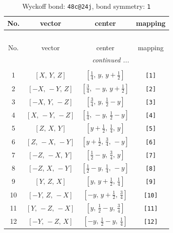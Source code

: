 \documentclass[fleqn,8pt]{jsarticle}
\begin{document}
\begin{longtable}{cccc}
\caption{Wyckoff bond: {\tt 48c@24j}, bond symmetry: {\tt 1}}
 \\
 \hline \hline
No. & vector & center & mapping \\ \hline \endfirsthead

\multicolumn{3}{l}{\tablename\ \thetable{}} \\
 \hline \hline
No. & vector & center & mapping \\ \hline \endhead

 \hline \hline
\multicolumn{3}{r}{\footnotesize\it continued ...} \\ \endfoot

 \hline \hline
\multicolumn{3}{r}{} \\ \endlastfoot

1 & $\left[ X,\, Y,\, Z \right]$ & $\left[ \frac{1}{4},\, y,\, y + \frac{1}{2} \right]$ & {\tt [1]} \\ \hline
2 & $\left[ - X,\, - Y,\, Z \right]$ & $\left[ \frac{3}{4},\, - y,\, y + \frac{1}{2} \right]$ & {\tt [2]} \\ \hline
3 & $\left[ - X,\, Y,\, - Z \right]$ & $\left[ \frac{3}{4},\, y,\, \frac{1}{2} - y \right]$ & {\tt [3]} \\ \hline
4 & $\left[ X,\, - Y,\, - Z \right]$ & $\left[ \frac{1}{4},\, - y,\, \frac{1}{2} - y \right]$ & {\tt [4]} \\ \hline
5 & $\left[ Z,\, X,\, Y \right]$ & $\left[ y + \frac{1}{2},\, \frac{1}{4},\, y \right]$ & {\tt [5]} \\ \hline
6 & $\left[ Z,\, - X,\, - Y \right]$ & $\left[ y + \frac{1}{2},\, \frac{3}{4},\, - y \right]$ & {\tt [6]} \\ \hline
7 & $\left[ - Z,\, - X,\, Y \right]$ & $\left[ \frac{1}{2} - y,\, \frac{3}{4},\, y \right]$ & {\tt [7]} \\ \hline
8 & $\left[ - Z,\, X,\, - Y \right]$ & $\left[ \frac{1}{2} - y,\, \frac{1}{4},\, - y \right]$ & {\tt [8]} \\ \hline
9 & $\left[ Y,\, Z,\, X \right]$ & $\left[ y,\, y + \frac{1}{2},\, \frac{1}{4} \right]$ & {\tt [9]} \\ \hline
10 & $\left[ - Y,\, Z,\, - X \right]$ & $\left[ - y,\, y + \frac{1}{2},\, \frac{3}{4} \right]$ & {\tt [10]} \\ \hline
11 & $\left[ Y,\, - Z,\, - X \right]$ & $\left[ y,\, \frac{1}{2} - y,\, \frac{3}{4} \right]$ & {\tt [11]} \\ \hline
12 & $\left[ - Y,\, - Z,\, X \right]$ & $\left[ - y,\, \frac{1}{2} - y,\, \frac{1}{4} \right]$ & {\tt [12]} \\ \hline

\end{longtable}
\end{document}
